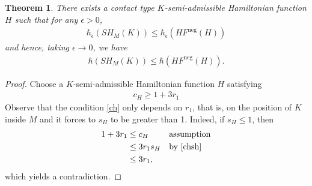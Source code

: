 \documentclass[12pt]{amsart}
\newtheorem{theorem}{Theorem}[section]
\theoremstyle{definition}
\begin{document}
\begin{theorem}\label{rene}
    There exists a contact type $K$-semi-admissible Hamiltonian function $H$ such that for any $\epsilon>0$, 
         \begin{align*}
       \hbar_{\epsilon}(SH_M(K)) \leq \hbar_{\epsilon}(HF^{\textrm{neg}}(H))
    \end{align*}
    and hence, taking $\epsilon \to 0$, we have  
    \begin{align*}
       \hbar(SH_M(K)) \leq \hbar(HF^{\textrm{neg}}(H)).
        \end{align*}
  
    
\end{theorem}
\begin{proof}
Choose a $K$-semi-admissible Hamiltonian function $H$ satisfying
\begin{align}\label{ch}
    c_H \geq 1+3r_1
\end{align}
Observe that the condition \eqref{ch} only depends on $r_1$, that is, on the position of $K$ inside $M$ and it forces to $s_H$ to be greater than 1. Indeed, if $s_H \leq 1$, then
\begin{align*}
    1+3r_1 &\leq c_H &&\textrm{assumption}\\
    &\leq 3r_1 s_H &&\textrm{by \eqref{chsh}}\\
    &\leq 3r_1,
\end{align*}
which yields a contradiction.

\vspace{0.2cm}


\end{proof}
\end{document}
